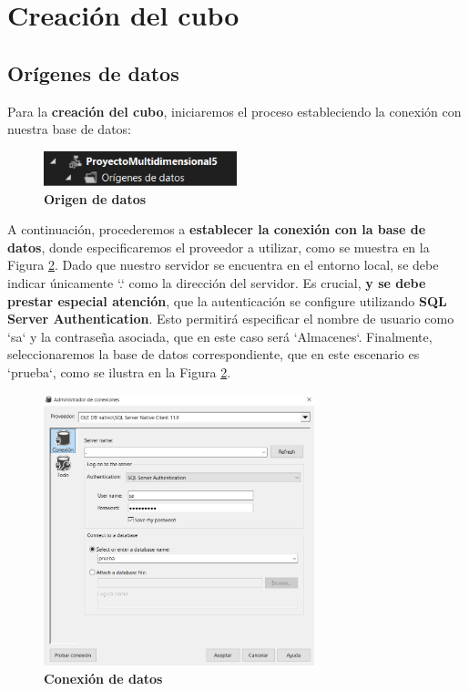 \documentclass[12pt, a4paper, twoside]{article}
\begin{document}
		
	
\section{\textbf{Creación del cubo}}

\subsection{\textbf{Orígenes de datos}}

Para la \textbf{creación del cubo}, iniciaremos el proceso estableciendo la conexión con nuestra base de datos:

\begin{figure}[H]
	\centering
	\includegraphics[width=0.5\textwidth]{image/origenDatos}
	\caption{\textbf{Origen de datos}}
	\label{fig:1}
\end{figure}

A continuación, procederemos a \textbf{establecer la conexión con la base de datos}, donde especificaremos el proveedor a utilizar, como se muestra en la Figura \ref{fig:2}. Dado que nuestro servidor se encuentra en el entorno local, se debe indicar únicamente `.` como la dirección del servidor. Es crucial, \textbf{y se debe prestar especial atención}, que la autenticación se configure utilizando \textbf{SQL Server Authentication}. Esto permitirá especificar el nombre de usuario como `sa` y la contraseña asociada, que en este caso será `Almacenes`. Finalmente, seleccionaremos la base de datos correspondiente, que en este escenario es `prueba`, como se ilustra en la Figura \ref{fig:2}.

\begin{figure}[H]
	\centering
	\includegraphics[width=0.7\textwidth]{image/conexion}
	\caption{\textbf{Conexión de datos}}
	\label{fig:2}
\end{figure}
\end{document}
